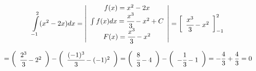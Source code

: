 \documentclass[a4paper,12pt]{article}
\begin{document}
$$\int\limits_{-1}^2 (x^2 - 2x) dx =\left|
	\begin{array}{c}
	f(x) = x^2 - 2x \\
	\int f(x)dx = \cfrac{x^3}{3} - x^2 + C \\
	F(x) = \cfrac{x^3}{3} - x^2
	\end{array}
	\right|
= \left[
	\begin{array}{c}
	\cfrac{x^3}{3} - x^2
	\end{array}
	\right]_{-1}^2
$$

$$ = \left(
	\begin{array}{c}
{\cfrac{2^3}{3} - 2^2}
	\end{array}
	\right)
 - \left(
	\begin{array}{c}
	\cfrac{(-1)^3}{3} - (-1)^2
	\end{array}
	\right) 
= \left(
	\begin{array}{c}
\cfrac{8}{3} - 4
	\end{array}
	\right)
 - \left(
	\begin{array}{c}
	-\cfrac{1}{3} - 1
	\end{array}
	\right)
 = -\frac{4}{3} + \frac{4}{3} = 0 $$
\end{document}
